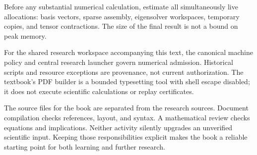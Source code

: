 Before any substantial numerical calculation, estimate all
simultaneously live allocations: basis vectors, sparse assembly,
eigensolver workspaces, temporary copies, and tensor contractions.
The size of the final result is not a bound on peak memory.

For the shared research workspace accompanying this text, the
canonical machine policy and central research launcher govern
numerical admission. Historical scripts and resource exceptions
are provenance, not current authorization. The textbook's PDF
builder is a bounded typesetting tool with shell escape disabled;
it does not execute scientific calculations or replay certificates.

The source files for the book are separated from the research
sources. Document compilation checks references, layout, and
syntax. A mathematical review checks equations and implications.
Neither activity silently upgrades an unverified scientific input.
Keeping those responsibilities explicit makes the book a reliable
starting point for both learning and further research.
